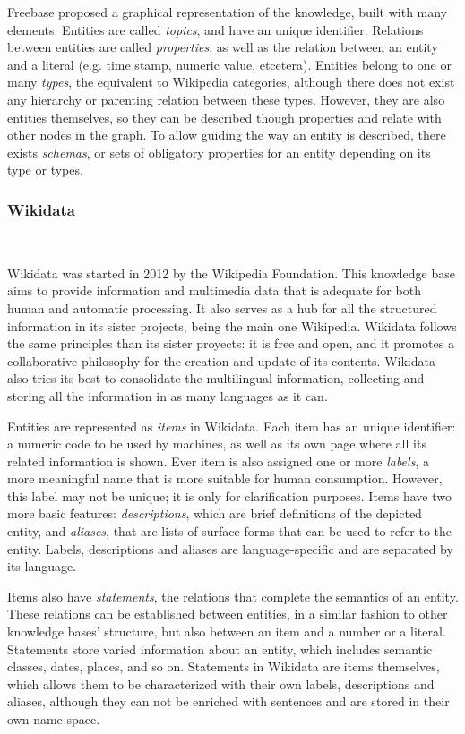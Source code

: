 Freebase proposed a graphical representation of the knowledge, built with many elements. Entities are called \emph{topics}, and have an unique identifier. Relations between entities are called \emph{properties}, as well as the relation between an entity and a literal (e.g. time stamp, numeric value, etcetera). Entities belong to one or many \emph{types}, the equivalent to Wikipedia categories, although there does not exist any hierarchy or parenting relation between these types. However, they are also entities themselves, so they can be described though properties and relate with other nodes in the graph. To allow guiding the way an entity is described, there exists \emph{schemas}, or sets of obligatory properties for an entity depending on its type or types.

\subsubsection{Wikidata}~

Wikidata was started in 2012 by the Wikipedia Foundation. This knowledge base aims to provide information and multimedia data that is adequate for both human and automatic processing. It also serves as a hub for all the structured information in its sister projects, being the main one Wikipedia. Wikidata follows the same principles than its sister proyects: it is free and open, and it promotes a collaborative philosophy for the creation and update of its contents. Wikidata also tries its best to consolidate the multilingual information, collecting and storing all the information in as many languages as it can.

Entities are represented as \emph{items} in Wikidata. Each item has an unique identifier: a numeric code to be used by machines, as well as its own page where all its related information is shown. Ever item is also assigned one or more \emph{labels}, a more meaningful name that is more suitable for human consumption.  However, this label may not be unique; it is only for clarification purposes. Items have two more basic features: \emph{descriptions}, which are brief definitions of the depicted entity, and \emph{aliases}, that are lists of surface forms that can be used to refer to the entity. Labels, descriptions and aliases are language-specific and are separated by its language.

Items also have \emph{statements}, the relations that complete the semantics of an entity. These relations can be established between entities, in a similar fashion to other knowledge bases' structure, but also between an item and a number or a literal. Statements store varied information about an entity, which includes semantic classes, dates, places, and so on. Statements in Wikidata are items themselves, which allows them to be characterized with their own labels, descriptions and aliases, although they can not be enriched with sentences and are stored in their own name space.

